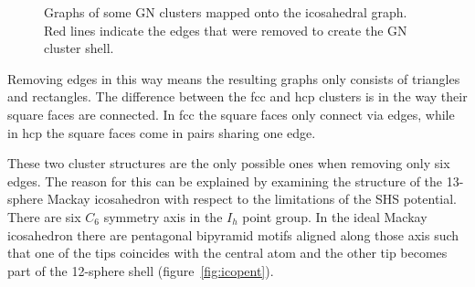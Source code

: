 \begin{figure}
    \centering
    \hspace{0.03\textwidth}
    \hspace{0.03\textwidth}
    \caption{Graphs of some \acs{GN} clusters mapped onto the icosahedral graph.
    Red lines indicate the edges that were removed to create the \acs{GN}
    cluster shell.}
    \label{fig:GNshellgraphs}
\end{figure}

Removing edges in this way means the resulting graphs only consists of
triangles and rectangles. The difference between the \ac{fcc} and hcp clusters
is in the way their square faces are connected. In \ac{fcc} the square faces
only connect via edges, while in hcp the square faces come in pairs sharing one
edge. 

These two cluster structures are the only possible ones when removing only six
edges. The reason for this can be explained by examining the structure of the
13-sphere Mackay icosahedron with respect to the limitations of the \ac{SHS}
potential. There are six $C_6$ symmetry axis in the $I_h$ point group. In the
ideal Mackay icosahedron there are pentagonal bipyramid motifs aligned along
those axis such that one of the tips coincides with the central atom and the
other tip becomes part of the 12-sphere shell (figure~\ref{fig:icopent}). 

